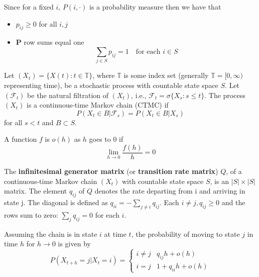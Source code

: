 \begin{remark}
Since for a fixed $i$, $P(i, \cdot)$ is a probability measure then we have that
\begin{itemize}
    \item $p_{ij} \geq 0$ for all $i,j$
    \item $\mathbf{P}$ row sums equal one
    $$
    \sum_{j \in S} p_{ij} = 1 \quad \text{for each } i \in S
    $$
\end{itemize}
\end{remark}

\begin{defn} \cite{schapira2017}
Let $(X_t) = \{X(t) : t \in \mathbb T\}$, where $\mathbb T$ is some index set (generally $\mathbb T = [0, \infty)$ representing time), be a stochastic process with countable state space $S$.
Let $(\mathscr{F}_t)$ be the natural filtration of $(X_t)$, i.e., $\mathscr{F}_t = \sigma\{ X_s : s \leq t \}$.
The process $(X_t)$ is a continuous-time Markov chain (CTMC) if
$$
P(X_{t} \in B | \mathscr{F}_s) = P(X_{t} \in B | X_s)
$$
for all $s < t$ and $B \subset S$.

\end{defn}

\begin{defn}
A function $f$ is $o(h)$ as $h$ goes to 0 if 
$$
\lim_{h \to 0} \frac{f(h)}{h} = 0
$$
\end{defn}

\begin{defn}
The \textbf{infinitesimal generator matrix} (or \textbf{transition rate matrix}) $Q$, of a continuous-time Markov chain $(X_t)$ with countable state space $S$, is an $|S| \times |S|$ matrix.
The element $q_{ij}$ of $Q$ denotes the rate departing from i and arriving in state j.
The diagonal is defined as $q_{ii} = - \sum_{j \not = i} q_{ij}$.
Each $i \not = j, q_{ij} \geq 0$ and the rows sum to zero: $\sum_{j} q_{ij} = 0$ for each $i$.

Assuming the chain is in state $i$ at time $t$, the probability of moving to state $j$ in time $h$ for $h \to 0$ is given by
$$
P(X_{t + h} = j | X_{t} = i) = \begin{cases}
    i \not = j & q_{ij} h + o(h)\\
    i = j & 1 + q_{ii} h + o(h)
\end{cases}
$$
\end{defn}

